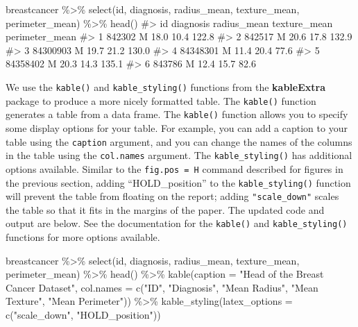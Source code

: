 \documentclass[
  letterpaper,
]{krantz}
\makeatletter
\newenvironment{Shaded}{\begin{snugshade}}{\end{snugshade}}
\newcommand{\AttributeTok}[1]{\textcolor[rgb]{0.40,0.45,0.13}{#1}}
\newcommand{\CommentTok}[1]{\textcolor[rgb]{0.37,0.37,0.37}{#1}}
\newcommand{\FunctionTok}[1]{\textcolor[rgb]{0.28,0.35,0.67}{#1}}
\newcommand{\NormalTok}[1]{\textcolor[rgb]{0.00,0.23,0.31}{#1}}
\newcommand{\SpecialCharTok}[1]{\textcolor[rgb]{0.37,0.37,0.37}{#1}}
\newcommand{\StringTok}[1]{\textcolor[rgb]{0.13,0.47,0.30}{#1}}
\newenvironment{kframe}{%
\medskip{}
\setlength{\fboxsep}{.8em}
 \def\at@end@of@kframe{}%
 \ifinner\ifhmode%
  \def\at@end@of@kframe{\end{minipage}}%
  \begin{minipage}{\columnwidth}%
 \fi\fi%
 \def\FrameCommand##1{\hskip\@totalleftmargin \hskip-\fboxsep
 \colorbox{shadecolor}{##1}\hskip-\fboxsep
     \hskip-\linewidth \hskip-\@totalleftmargin \hskip\columnwidth}%
 \MakeFramed {\advance\hsize-\width
   \@totalleftmargin\z@ \linewidth\hsize
   \@setminipage}}%
 {\par\unskip\endMakeFramed%
 \at@end@of@kframe}
\renewenvironment{Shaded}{\begin{kframe}}{\end{kframe}}
\makeatother
\begin{document}
\begin{Shaded}
\begin{Highlighting}[]
\NormalTok{breastcancer }\SpecialCharTok{\%\textgreater{}\%} 
  \FunctionTok{select}\NormalTok{(id, diagnosis, radius\_mean, texture\_mean, perimeter\_mean) }\SpecialCharTok{\%\textgreater{}\%}   
  \FunctionTok{head}\NormalTok{()}
\CommentTok{\#\textgreater{}         id diagnosis radius\_mean texture\_mean perimeter\_mean}
\CommentTok{\#\textgreater{} 1   842302         M        18.0         10.4          122.8}
\CommentTok{\#\textgreater{} 2   842517         M        20.6         17.8          132.9}
\CommentTok{\#\textgreater{} 3 84300903         M        19.7         21.2          130.0}
\CommentTok{\#\textgreater{} 4 84348301         M        11.4         20.4           77.6}
\CommentTok{\#\textgreater{} 5 84358402         M        20.3         14.3          135.1}
\CommentTok{\#\textgreater{} 6   843786         M        12.4         15.7           82.6}
\end{Highlighting}
\end{Shaded}

We use the \texttt{kable()} and \texttt{kable\_styling()} functions from
the \textbf{kableExtra} package to produce a more nicely formatted
table. The \texttt{kable()} function generates a table from a data
frame. The \texttt{kable()} function allows you to specify some display
options for your table. For example, you can add a caption to your table
using the \texttt{caption} argument, and you can change the names of the
columns in the table using the \texttt{col.names} argument. The
\texttt{kable\_styling()} has additional options available. Similar to
the \texttt{fig.pos\ =\ H} command described for figures in the previous
section, adding ``HOLD\_position'' to the \texttt{kable\_styling()}
function will prevent the table from floating on the report; adding
\texttt{"scale\_down"} scales the table so that it fits in the margins
of the paper. The updated code and output are below. See the
documentation for the \texttt{kable()} and \texttt{kable\_styling()}
functions for more options available.

\begin{Shaded}
\begin{Highlighting}[]
\NormalTok{breastcancer }\SpecialCharTok{\%\textgreater{}\%} 
  \FunctionTok{select}\NormalTok{(id, diagnosis, radius\_mean, texture\_mean, perimeter\_mean) }\SpecialCharTok{\%\textgreater{}\%} 
  \FunctionTok{head}\NormalTok{() }\SpecialCharTok{\%\textgreater{}\%} 
  \FunctionTok{kable}\NormalTok{(}\AttributeTok{caption =} \StringTok{"Head of the Breast Cancer Dataset"}\NormalTok{, }
      \AttributeTok{col.names =} \FunctionTok{c}\NormalTok{(}\StringTok{"ID"}\NormalTok{, }\StringTok{"Diagnosis"}\NormalTok{, }\StringTok{"Mean Radius"}\NormalTok{, }\StringTok{"Mean Texture"}\NormalTok{, }
      \StringTok{"Mean Perimeter"}\NormalTok{)) }\SpecialCharTok{\%\textgreater{}\%}   
  \FunctionTok{kable\_styling}\NormalTok{(}\AttributeTok{latex\_options =} \FunctionTok{c}\NormalTok{(}\StringTok{"scale\_down"}\NormalTok{, }\StringTok{"HOLD\_position"}\NormalTok{))}
\end{Highlighting}
\end{Shaded}
\end{document}
